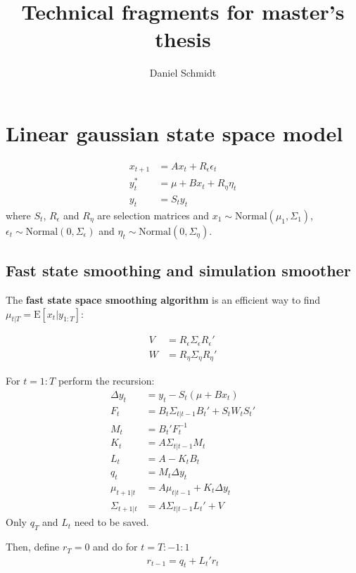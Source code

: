 \documentclass[12pt,a4paper]{scrartcl}
\title{Technical fragments for master's thesis}
\author{Daniel Schmidt}
\newcommand{\E}{\mathrm{E}}
\begin{document}
	
\maketitle

\section{Linear gaussian state space model}

\begin{align*}
x_{t+1} &= A x_t + R_\epsilon \epsilon_t \\
y^*_t   &= \mu + B x_t + R_\eta \eta_t \\
y_t     &= S_t y_t 
\end{align*}
where $S_t$, $R_\epsilon$ and $R_\eta$ are selection matrices and $x_1 \sim \mathrm{Normal}(\mu_1, \Sigma_1)$, $\epsilon_t \sim \mathrm{Normal}(0, \Sigma_\epsilon)$ and $\eta_t \sim \mathrm{Normal}(0, \Sigma_\eta)$.

\subsection{Fast state smoothing and simulation smoother}

The \textbf{fast state space smoothing algorithm} \citep{bibid} is an efficient way to find $\mu_{t|T} = \E[x_t|y_{1:T}]$:

\begin{align*}
V &= R_\epsilon \Sigma_\epsilon R_\epsilon' \\
W &= R_\eta \Sigma_\eta R_\eta'
\end{align*}

For $t=1:T$ perform the recursion:
\begin{align*}
\Delta y_t &= y_t - S_t(\mu + B x_t) \\
F_t &= B_t \Sigma_{t|t-1} B_t' + S_t W_t S_t' \\
M_t &= B_t' F_t^{-1} \\
K_t &= A \Sigma_{t|t-1} M_t \\
L_t &= A - K_t B_t \\
q_t &= M_t \Delta y_t \\
\mu_{t+1|t} &= A \mu_{t|t-1} + K_t \Delta y_t \\
\Sigma_{t+1|t} &= A \Sigma_{t|t-1} L_t' + V 
\end{align*}
Only $q_T$ and $L_t$ need to be saved.

Then, define $r_T=0$ and do for $t=T:-1:1$
\begin{align*}
r_{t-1} = q_t + L_t' r_t
\end{align*}
\end{document}
